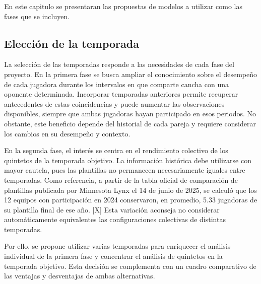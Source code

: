 En este capitulo se presentaran las propuestas de modelos a utilizar como las fases que se incluyen.
\subsection{Elección de la temporada}
La selección de las temporadas responde a las necesidades de cada fase del proyecto. En la primera fase se busca ampliar el conocimiento sobre el desempeño de cada jugadora durante los intervalos en que comparte cancha con una oponente determinada. Incorporar temporadas anteriores permite recuperar antecedentes de estas coincidencias y puede aumentar las observaciones disponibles, siempre que ambas jugadoras hayan participado en esos periodos. No obstante, este beneficio depende del historial de cada pareja y requiere considerar los cambios en su desempeño y contexto.

En la segunda fase, el interés se centra en el rendimiento colectivo de los quintetos de la temporada objetivo. La información histórica debe utilizarse con mayor cautela, pues las plantillas no permanecen necesariamente iguales entre temporadas. Como referencia, a partir de la tabla oficial de comparación de plantillas publicada por Minnesota Lynx el 14 de junio de 2025, se calculó que los 12 equipos con participación en 2024 conservaron, en promedio, 5.33 jugadoras de su plantilla final de ese año. [X] Esta variación aconseja no considerar automáticamente equivalentes las configuraciones colectivas de distintas temporadas.

Por ello, se propone utilizar varias temporadas para enriquecer el análisis individual de la primera fase y concentrar el análisis de quintetos en la temporada objetivo. Esta decisión se complementa con un cuadro comparativo de las ventajas y desventajas de ambas alternativas.


